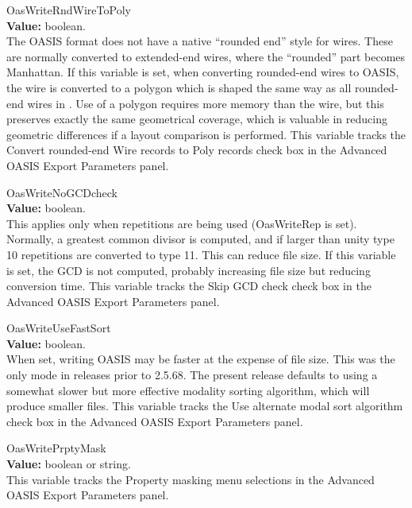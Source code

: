\begin{description}
\item{\et OasWriteRndWireToPoly}\\
{\bf Value:} boolean.\\
The OASIS format does not have a native ``rounded end'' style for
wires.  These are normally converted to extended-end wires, where the
``rounded'' part becomes Manhattan.  If this variable is set, when
converting rounded-end wires to OASIS, the wire is converted to a
polygon which is shaped the same way as all rounded-end wires in
{\Xic}.  Use of a polygon requires more memory than the wire, but this
preserves exactly the same geometrical coverage, which is valuable in
reducing geometric differences if a layout comparison is performed. 
This variable tracks the {\cb Convert rounded-end Wire records to Poly
records} check box in the {\cb Advanced OASIS Export Parameters}
panel.

\item{\et OasWriteNoGCDcheck}\\
{\bf Value:} boolean.\\
This applies only when repetitions are being used ({\et OasWriteRep}
is set).  Normally, a greatest common divisor is computed, and if
larger than unity type 10 repetitions are converted to type 11.  This
can reduce file size.  If this variable is set, the GCD is not
computed, probably increasing file size but reducing conversion time. 
This variable tracks the {\cb Skip GCD check} check box in the {\cb
Advanced OASIS Export Parameters} panel.

\item{\et OasWriteUseFastSort}\\
{\bf Value:} boolean.\\
When set, writing OASIS may be faster at the expense of file size. 
This was the only mode in releases prior to 2.5.68.  The present
release defaults to using a somewhat slower but more effective
modality sorting algorithm, which will produce smaller files.  This
variable tracks the {\cb Use alternate modal sort algorithm} check box
in the {\cb Advanced OASIS Export Parameters} panel.

\item{\et OasWritePrptyMask}\\
{\bf Value:} boolean or string.\\
This variable tracks the {\cb Property masking} menu selections in the
{\cb Advanced OASIS Export Parameters} panel.


\end{description}
